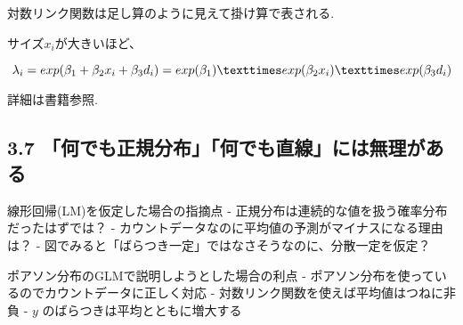 \documentclass[
]{article}
\begin{document}
対数リンク関数は足し算のように見えて掛け算で表される.

サイズ\(x_i\)が大きいほど、

\[
  \lambda_i = exp(\beta_1 + \beta_2 x_i + \beta_3d_i)  \\
  = exp(\beta_1) × exp(\beta_2 x_i) × exp(\beta_3 d_i)
\]

詳細は書籍参照.

\hypertarget{ux4f55ux3067ux3082ux6b63ux898fux5206ux5e03ux4f55ux3067ux3082ux76f4ux7ddaux306bux306fux7121ux7406ux304cux3042ux308b}{%
\subsection{3.7
「何でも正規分布」「何でも直線」には無理がある}\label{ux4f55ux3067ux3082ux6b63ux898fux5206ux5e03ux4f55ux3067ux3082ux76f4ux7ddaux306bux306fux7121ux7406ux304cux3042ux308b}}

線形回帰(LM)を仮定した場合の指摘点 -
正規分布は連続的な値を扱う確率分布だったはずでは？ -
カウントデータなのに平均値の予測がマイナスになる理由は？ -
図でみると「ばらつき一定」ではなさそうなのに、分散一定を仮定？

ポアソン分布のGLMで説明しようとした場合の利点 -
ポアソン分布を使っているのでカウントデータに正しく対応 -
対数リンク関数を使えば平均値はつねに非負 - \(y\)
のばらつきは平均とともに増大する
\end{document}
